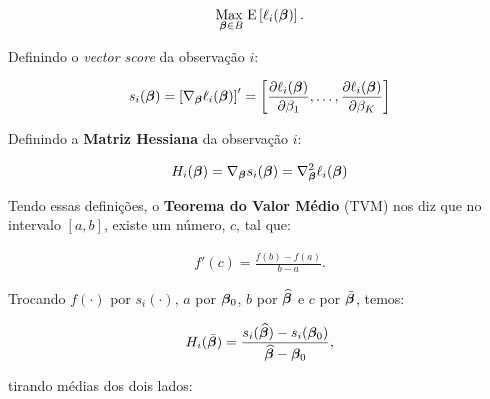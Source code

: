 \documentclass[11pt, oneside, a4paper, article]{article}
\numberwithin{equation}{section}
\begin{document}
\begin{description}
\vspace{-1 em}
\begin{align*}
\underset{\boldsymbol{\beta} \in B}{\text{Max }} 
\text{E} \left[ 
\ell_{i} ( \boldsymbol{\beta} )
\right].
\end{align*}

Definindo o \textit{vector score} da observação $i$:

\vspace{-1 em}
\begin{align*}
s_{i} (\boldsymbol{\beta}) = 
\left[ \nabla_{\boldsymbol{\beta}} \ell_{i} (\boldsymbol{\beta}) \right]'
=
\begin{bmatrix}
\dfrac{\partial{\ell_{i} (\ensuremath{\boldsymbol{\beta}})}}{\partial{\beta_{1}}},
\dots,
\dfrac{\partial{\ell_{i} (\ensuremath{\boldsymbol{\beta}})}}{\partial{\beta_{K}}}
\end{bmatrix}
\end{align*}

Definindo a \textbf{Matriz Hessiana} da observação $i$:

\vspace{-1 em}
\begin{align*}
H_{i} (\boldsymbol{\beta}) = 
\nabla_{\boldsymbol{\beta}} s_{i} (\boldsymbol{\beta}) = 
\nabla_{\boldsymbol{\beta}}^2 \ell_{i} (\boldsymbol{\beta})
\end{align*}

Tendo essas definições, o \textbf{Teorema do Valor Médio} (TVM) nos diz que no intervalo $[a, b]$, existe um número, $c$, tal que:

\vspace{-1 em}
\begin{align*}
f'(c) = \frac{f(b) - f(a)}{b - a}.
\end{align*}

\vspace{1 em}
\begin{center}
\end{center}
\vspace{1 em}

Trocando 
$f(\cdot)$ por $s_{i}(\cdot)$, 
$a$ por $\boldsymbol{\beta}_{0}$, 
$b$ por $\widehat{\boldsymbol{\beta}}$ e
$c$ por $\bar{\boldsymbol{\beta}}$,
temos:

\vspace{-1 em}
\begin{align*}
H_{i} ( \bar{\boldsymbol{\beta}} ) =
\frac{s_{i}( \widehat{\boldsymbol{\beta}} ) - s_{i}( \boldsymbol{\beta}_{0} )}{\widehat{\boldsymbol{\beta}} - \boldsymbol{\beta}_{0}},
\end{align*}

\noindent
tirando médias dos dois lados:


\end{description}
\end{document}
